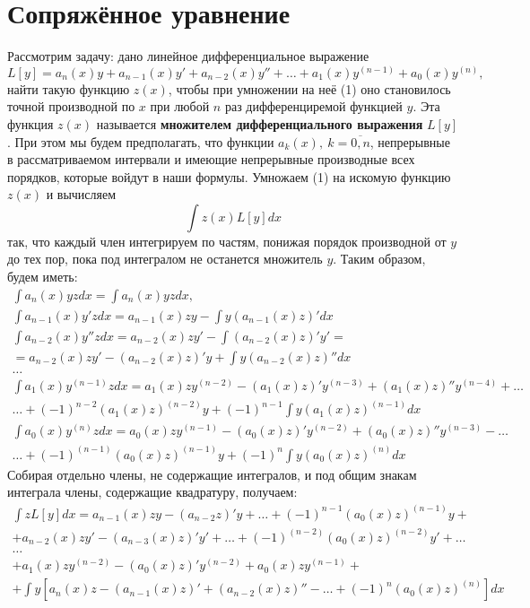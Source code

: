 \section{Сопряжённое уравнение}
Рассмотрим задачу: дано линейное дифференциальное выражение
\[
	L[y] = a_n (x) y + a_{n-1} (x) y' + a_{n-2} (x) y'' + \dots + a_1 (x) y^{(n-1)} + a_0 (x) y^{(n)}, \tag{1}
\]
найти такую функцию $z(x)$, чтобы при умножении на неё (1) оно становилось точной производной по $x$ при любой $n$ раз дифференциремой функцией $y$. Эта функция $z(x)$ называется \textbf{множителем дифференциального выражения} $L[y]$. При этом мы будем предполагать, что функции $a_k(x), ~ k = \overline{0,n}$, непрерывные в рассматриваемом интервали и имеющие непрерывные производные всех порядков, которые войдут в наши формулы. Умножаем (1) на искомую функцию $z(x)$ и вычисляем
\[
	\int z(x) L[y] dx
\]
так, что каждый член интегрируем по частям, понижая порядок производной от $y$ до тех пор, пока под интегралом не останется множитель $y$. Таким образом, будем иметь:
\[
	\begin{aligned}
		\int a_n (x) yzdx = \int a_n (x) yzdx, \\
		\int a_{n-1} (x) y'zdx = a_{n-1} (x) zy - \int y(a_{n-1} (x)z)'dx \\
		\int a_{n-2} (x) y''zdx = a_{n-2}(x) zy' - \int (a_{n-2} (x)z)' y' = \\
		= a_{n-2} (x) zy' - (a_{n-2} (x) z)'y + \int y(a_{n-2}(x)z)''dx \\
		\dots \\
		\int a_1 (x) y^{(n-1)}zdx = a_1 (x)zy^{(n-2)} - (a_1(x)z)'y^{(n-3)}+(a_1(x)z)''y^{(n-4)} + \dots \\
		\dots + (-1)^{n-2} (a_1(x)z)^{(n-2)}y + (-1)^{n-1} \int y(a_1(x)z)^{(n-1)}dx \\
		\int a_0(x) y^{(n)}zdx = a_0(x)zy^{(n-1)} - (a_0(x)z)'y^{(n-2)} + (a_0(x)z)''y^{(n-3)} - \dots \\
		\dots + (-1)^{(n-1)} (a_0(x)z)^{(n-1)}y + (-1)^n \int y(a_0(x)z)^{(n)}dx
	\end{aligned}
\]
Собирая отдельно члены, не содержащие интегралов, и под общим знакам интеграла члены, содержащие квадратуру, получаем:
\[
	\begin{aligned}
		\int zL[y]dx = a_{n-1} (x) zy - (a_{n-2}z)'y + \dots + (-1)^{n-1} (a_0(x)z)^{(n-1)}y + \\
		+ a_{n-2}(x)zy'-(a_{n-3}(x)z)'y' + \dots + (-1)^{(n-2)}(a_0(x)z)^{(n-2)}y' + \dots \\
		\dots \\
		+ a_1(x)zy^{(n-2)} - (a_0(x)z)'y^{(n-2)} + a_0(x) zy^{(n-1)} + \\
		+ \int y\left[ a_n(x)z - (a_{n-1}(x)z)' + (a_{n-2}(x)z)''- \dots + (-1)^n (a_0(x)z)^{(n)}\right]dx
	\end{aligned}
\]
